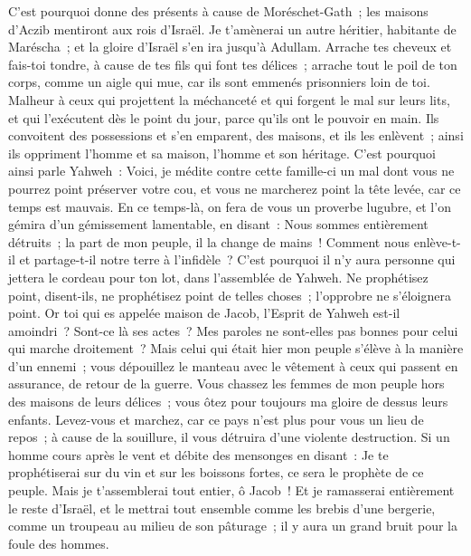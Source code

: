 \begin{multicols}{2}
C'est pourquoi donne des présents à cause de Moréschet-Gath~; les maisons d'Aczib mentiront aux rois d'Israël.
Je t'amènerai un autre héritier, habitante de Maréscha~; et la gloire d'Israël s'en ira jusqu'à Adullam.
Arrache tes cheveux et fais-toi tondre, à cause de tes fils qui font tes délices~; arrache tout le poil de ton corps, comme un aigle qui mue, car ils sont emmenés prisonniers loin de toi.
\VerseOne{}Malheur à ceux qui projettent la méchanceté et qui forgent le mal sur leurs lits, et qui l'exécutent dès le point du jour, parce qu'ils ont le pouvoir en main.
Ils convoitent des possessions et s'en emparent, des maisons, et ils les enlèvent~; ainsi ils oppriment l'homme et sa maison, l'homme et son héritage.
C'est pourquoi ainsi parle Yahweh~: Voici, je médite contre cette famille-ci un mal dont vous ne pourrez point préserver votre cou, et vous ne marcherez point la tête levée, car ce temps est mauvais.
En ce temps-là, on fera de vous un proverbe lugubre, et l'on gémira d'un gémissement lamentable, en disant~: Nous sommes entièrement détruits~; la part de mon peuple, il la change de mains~! Comment nous enlève-t-il et partage-t-il notre terre à l'infidèle~?
C'est pourquoi il n'y aura personne qui jettera le cordeau pour ton lot, dans l'assemblée de Yahweh.
Ne prophétisez point, disent-ils, ne prophétisez point de telles choses~; l'opprobre ne s'éloignera point.
Or toi qui es appelée maison de Jacob, l'Esprit de Yahweh est-il amoindri~? Sont-ce là ses actes~? Mes paroles ne sont-elles pas bonnes pour celui qui marche droitement~?
Mais celui qui était hier mon peuple s'élève à la manière d'un ennemi~; vous dépouillez le manteau avec le vêtement à ceux qui passent en assurance, de retour de la guerre.
Vous chassez les femmes de mon peuple hors des maisons de leurs délices~; vous ôtez pour toujours ma gloire de dessus leurs enfants.
Levez-vous et marchez, car ce pays n'est plus pour vous un lieu de repos~; à cause de la souillure, il vous détruira d'une violente destruction.
Si un homme cours après le vent et débite des mensonges en disant~: Je te prophétiserai sur du vin et sur les boissons fortes, ce sera le prophète de ce peuple.
Mais je t'assemblerai tout entier, ô Jacob~! Et je ramasserai entièrement le reste d'Israël, et le mettrai tout ensemble comme les brebis d'une bergerie, comme un troupeau au milieu de son pâturage~; il y aura un grand bruit pour la foule des hommes.

\end{multicols}
